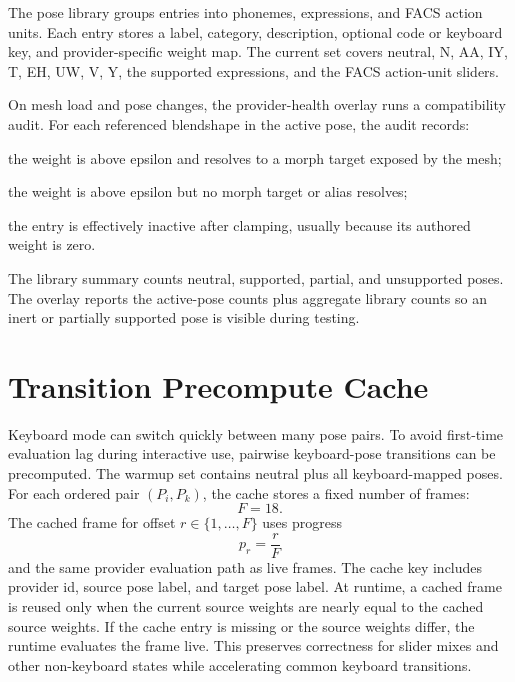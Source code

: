 \documentclass[11pt]{article}
\begin{document}
The pose library groups entries into phonemes, expressions, and FACS action units.  Each entry stores a label, category, description, optional code or keyboard key, and provider-specific weight map.  The current set covers neutral, N, AA, IY, T, EH, UW, V, Y, the supported expressions, and the FACS action-unit sliders.

On mesh load and pose changes, the provider-health overlay runs a compatibility audit.  For each referenced blendshape in the active pose, the audit records:
\begin{description}[leftmargin=*]
  \item[active] the weight is above epsilon and resolves to a morph target exposed by the mesh;
  \item[missing] the weight is above epsilon but no morph target or alias resolves;
  \item[unsupported] the entry is effectively inactive after clamping, usually because its authored weight is zero.
\end{description}
The library summary counts neutral, supported, partial, and unsupported poses.  The overlay reports the active-pose counts plus aggregate library counts so an inert or partially supported pose is visible during testing.

\section{Transition Precompute Cache}

Keyboard mode can switch quickly between many pose pairs.  To avoid first-time evaluation lag during interactive use, pairwise keyboard-pose transitions can be precomputed.  The warmup set contains neutral plus all keyboard-mapped poses.  For each ordered pair $(P_i,P_k)$, the cache stores a fixed number of frames:
\begin{equation}
  F = 18.
\end{equation}
The cached frame for offset $r \in \{1,\ldots,F\}$ uses progress
\begin{equation}
  p_r = \frac{r}{F}
\end{equation}
and the same provider evaluation path as live frames.  The cache key includes provider id, source pose label, and target pose label.  At runtime, a cached frame is reused only when the current source weights are nearly equal to the cached source weights.  If the cache entry is missing or the source weights differ, the runtime evaluates the frame live.  This preserves correctness for slider mixes and other non-keyboard states while accelerating common keyboard transitions.
\end{document}
